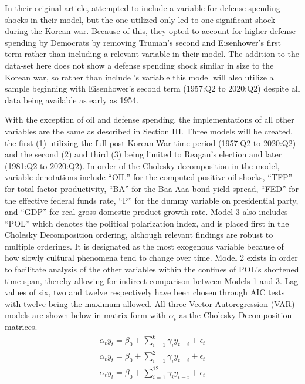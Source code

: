 \documentclass[a4paper, 12pt]{article}
\begin{document}
In their original article,  attempted to include a variable for defense spending shocks in their model, but the one utilized \cite{ramey2011} only led to one significant shock during the Korean war. Because of this, they opted to account for higher defense spending by Democrats by removing Truman’s second and Eisenhower’s first term rather than including a relevant variable in their model. The addition to the data-set here does not show a defense spending shock similar in size to the Korean war, so rather than include \citeauthor{ramey2011}’s variable this model will also utilize a sample beginning with Eisenhower’s second term (1957:Q2 to 2020:Q2) despite all data being available as early as 1954. \par

With the exception of oil and defense spending, the implementations of all other variables are the same as described in Section III. Three models will be created, the first (1) utilizing the full post-Korean War time period (1957:Q2 to 2020:Q2) and the second (2) and third (3) being limited to Reagan's election and later (1981:Q2 to 2020:Q2). In order of the Cholesky decomposition in the model, variable denotations include “OIL” for the computed positive oil shocks, “TFP” for total factor productivity, “BA” for the Baa-Aaa bond yield spread, “FED” for the effective federal funds rate, “P” for the dummy variable on presidential party, and “GDP” for real gross domestic product growth rate. Model 3 also includes “POL” which denotes the political polarization index, and is placed first in the Cholesky Decomposition ordering, although relevant findings are robust to multiple orderings. It is designated as the most exogenous variable because of how slowly cultural phenomena tend to change over time. Model 2 exists in order to facilitate analysis of the other variables within the confines of POL's shortened time-span, thereby allowing for indirect comparison between Models 1 and 3. Lag values of six, two and twelve respectively have been chosen through AIC tests with twelve being the maximum allowed. All three Vector Autoregression (VAR) models are shown below in matrix form with $\alpha_t$ as the Cholesky Decomposition matrices.
\begin{align}
\alpha_ty_t = \beta_0 + \sum_{i=1}^6\gamma_iy_{t-i} + \epsilon_t\\
\alpha_ty_t = \beta_0 + \sum_{i=1}^2\gamma_iy_{t-i} + \epsilon_t\\
\alpha_ty_t = \beta_0 + \sum_{i=1}^{12}\gamma_iy_{t-i} + \epsilon_t
\end{align}
\end{document}
